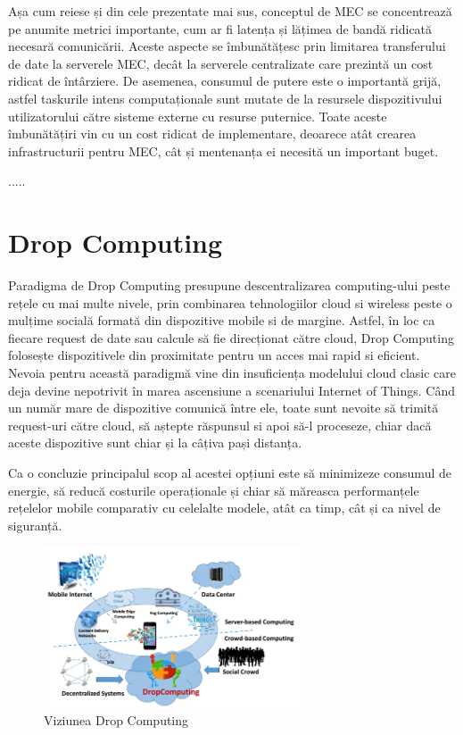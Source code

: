 \documentclass[12pt,a4paper]{report}
\begin{document}
Așa cum reiese și din cele prezentate mai sus, conceptul de MEC se concentrează pe anumite metrici importante, cum ar fi latența și lățimea de bandă ridicată necesară comunicării. Aceste aspecte se îmbunătățesc prin limitarea transferului de date la serverele MEC, decât la serverele centralizate care prezintă un cost ridicat de întârziere. De asemenea, consumul de putere este o importantă grijă, astfel taskurile intens computaționale sunt mutate de la resursele dispozitivului utilizatorului către sisteme externe cu resurse puternice. Toate aceste îmbunătățiri vin cu un cost ridicat de implementare, deoarece atât crearea infrastructurii pentru MEC, cât și mentenanța ei necesită un important buget. 

.....
\section{Drop Computing}
Paradigma de Drop Computing\cite{DC} presupune descentralizarea computing-ului peste rețele cu mai multe nivele, prin combinarea tehnologiilor cloud si wireless peste o mulțime socială formată din dispozitive mobile si de margine. Astfel, în loc ca fiecare request de date sau calcule să fie direcționat către cloud, Drop Computing folosește dispozitivele din proximitate pentru un acces mai rapid si eficient. Nevoia pentru această paradigmă vine din insuficiența modelului cloud clasic care deja devine nepotrivit în marea ascensiune a scenariului Internet of Things. Când un număr mare de dispozitive comunică între ele, toate sunt nevoite să trimită request-uri către cloud, să aștepte răspunsul si apoi să-l proceseze, chiar dacă aceste dispozitive sunt chiar și la câțiva pași distanța.

Ca o concluzie principalul scop al acestei opțiuni este să minimizeze consumul de energie, să reducă costurile operaționale și chiar să măreasca performanțele rețelelor mobile comparativ cu celelalte modele, atât ca timp, cât și ca nivel de siguranță.
	
\begin{figure}[th]
\centering
\includegraphics[width=3in]{pics/dropComputing.png}
  \caption{Viziunea Drop Computing}
  \label{fig:pic2}
\end{figure}
\end{document}
